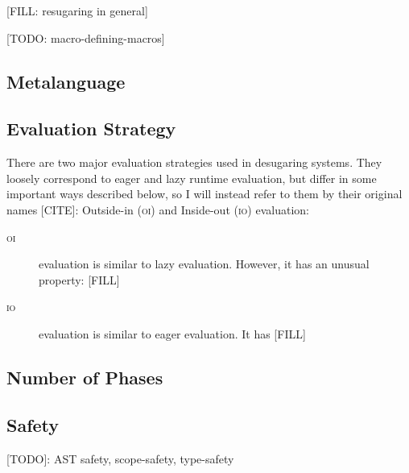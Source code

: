 [FILL: resugaring in general]

[TODO: macro-defining-macros]


\subsection{Metalanguage}


\subsection{Evaluation Strategy}

There are two major evaluation strategies used in desugaring systems.
They loosely correspond to eager and lazy runtime evaluation, but
differ in some important ways described below, so I will instead refer
to them by their original names [CITE]: Outside-in (\textsc{oi}) and
Inside-out (\textsc{io}) evaluation:
\begin{description}
\item[\textsc{oi}] evaluation is similar to lazy evaluation.
  However, it has an unusual property: [FILL]
\item[\textsc{io}] evaluation is similar to eager evaluation. It has [FILL]
\end{description}

\subsection{Number of Phases}

\subsection{Safety} [TODO]: AST safety, scope-safety, type-safety
